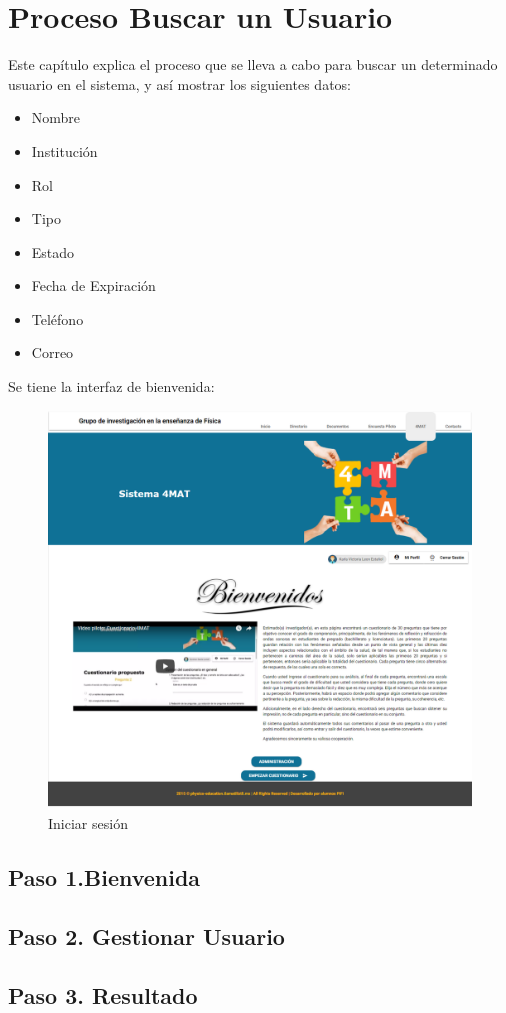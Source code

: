 \chapter{Proceso Buscar un Usuario}
	Este capítulo explica el proceso que se lleva a cabo para buscar
	un determinado usuario en el sistema, y así mostrar los siguientes datos:
	
	\begin{itemize}
	\item Nombre
	\item Institución
	\item Rol
	\item Tipo
	\item Estado
	\item Fecha de Expiración
	\item Teléfono
	\item Correo
	\end{itemize}
	
	Se tiene la interfaz de bienvenida:
	\begin{figure}[hbtp]
		\centering
		\includegraphics[scale=0.3]{images/Interfaz/IUGS01_binevenida.png}
		\caption{Iniciar sesión}
	\end{figure}


\section{Paso 1.Bienvenida}
	

\section{Paso 2. Gestionar Usuario}
	
	
\section{Paso 3. Resultado}
	
	